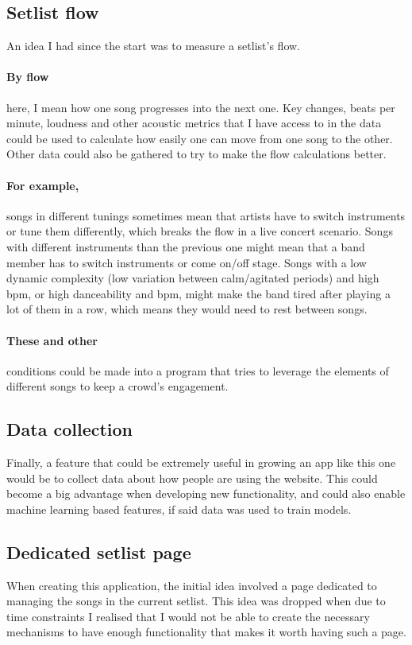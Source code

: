 \documentclass[10pt, a4paper]{article}
\begin{document}
	\subsection{Setlist flow}
	An idea I had since the start was to measure a setlist's flow.\\
	\paragraph{By flow} here, I mean how one song progresses into the next one. Key changes, beats per minute, loudness and other acoustic metrics that I have access to in the data could be used to calculate how easily one can move from one song to the other. Other data could also be gathered to try to make the flow calculations better.
	\paragraph{For example,} songs in different tunings sometimes mean that artists have to switch instruments or tune them differently, which breaks the flow in a live concert scenario.
	Songs with different instruments than the previous one might mean that a band member has to switch instruments or come on/off stage.
	Songs with a low dynamic complexity (low variation between calm/agitated periods) and high bpm, or high danceability and bpm, might make the band tired after playing a lot of them in a row, which means they would need to rest between songs.
	\paragraph{These and other} conditions could be made into a program that tries to leverage the elements of different songs to keep a crowd's engagement.
	
	\subsection{Data collection}
	Finally, a feature that could be extremely useful in growing an app like this one would be to collect data about how people are using the website. This could become a big advantage when developing new functionality, and could also enable machine learning based features, if said data was used to train models.
	
	\subsection{Dedicated setlist page}
	When creating this application, the initial idea involved a page dedicated to managing the songs in the current setlist. This idea was dropped when due to time constraints I realised that I would not be able to create the necessary mechanisms to have enough functionality that makes it worth having such a page.
\end{document}
